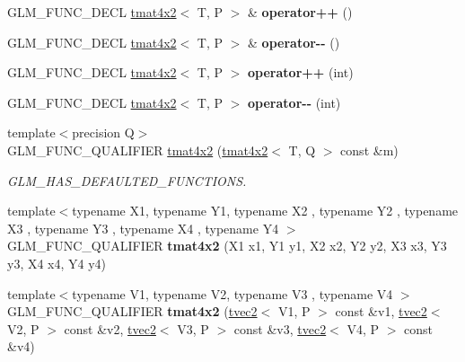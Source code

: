 \begin{DoxyCompactItemize}
G\+L\+M\+\_\+\+F\+U\+N\+C\+\_\+\+D\+E\+CL \hyperlink{structglm_1_1tmat4x2}{tmat4x2}$<$ T, P $>$ \& {\bfseries operator++} ()
\item 
\mbox{\label{structglm_1_1tmat4x2_acb22e08a3abe9442d718346508b76681}} 
G\+L\+M\+\_\+\+F\+U\+N\+C\+\_\+\+D\+E\+CL \hyperlink{structglm_1_1tmat4x2}{tmat4x2}$<$ T, P $>$ \& {\bfseries operator-\/-\/} ()
\item 
\mbox{\label{structglm_1_1tmat4x2_af0211253087f7df4afb95aeba8daef24}} 
G\+L\+M\+\_\+\+F\+U\+N\+C\+\_\+\+D\+E\+CL \hyperlink{structglm_1_1tmat4x2}{tmat4x2}$<$ T, P $>$ {\bfseries operator++} (int)
\item 
\mbox{\label{structglm_1_1tmat4x2_a6e82215ef61cf4f3b4a1cf3bfe21d6fc}} 
G\+L\+M\+\_\+\+F\+U\+N\+C\+\_\+\+D\+E\+CL \hyperlink{structglm_1_1tmat4x2}{tmat4x2}$<$ T, P $>$ {\bfseries operator-\/-\/} (int)
\item 
\mbox{\label{structglm_1_1tmat4x2_aabba725bdf197091f8eab5a583201fca}} 
{\footnotesize template$<$precision Q$>$ }\\G\+L\+M\+\_\+\+F\+U\+N\+C\+\_\+\+Q\+U\+A\+L\+I\+F\+I\+ER \hyperlink{structglm_1_1tmat4x2_aabba725bdf197091f8eab5a583201fca}{tmat4x2} (\hyperlink{structglm_1_1tmat4x2}{tmat4x2}$<$ T, Q $>$ const \&m)
\begin{DoxyCompactList}\small\item\em G\+L\+M\+\_\+\+H\+A\+S\+\_\+\+D\+E\+F\+A\+U\+L\+T\+E\+D\+\_\+\+F\+U\+N\+C\+T\+I\+O\+NS. \end{DoxyCompactList}\item 
\mbox{\label{structglm_1_1tmat4x2_af1595b0913a2bc31ff60ab847a351d4e}} 
{\footnotesize template$<$typename X1, typename Y1, typename X2 , typename Y2 , typename X3 , typename Y3 , typename X4 , typename Y4 $>$ }\\G\+L\+M\+\_\+\+F\+U\+N\+C\+\_\+\+Q\+U\+A\+L\+I\+F\+I\+ER {\bfseries tmat4x2} (X1 x1, Y1 y1, X2 x2, Y2 y2, X3 x3, Y3 y3, X4 x4, Y4 y4)
\item 
\mbox{\label{structglm_1_1tmat4x2_a3d41b266dfeb276e13db820296663cea}} 
{\footnotesize template$<$typename V1, typename V2, typename V3 , typename V4 $>$ }\\G\+L\+M\+\_\+\+F\+U\+N\+C\+\_\+\+Q\+U\+A\+L\+I\+F\+I\+ER {\bfseries tmat4x2} (\hyperlink{structglm_1_1tvec2}{tvec2}$<$ V1, P $>$ const \&v1, \hyperlink{structglm_1_1tvec2}{tvec2}$<$ V2, P $>$ const \&v2, \hyperlink{structglm_1_1tvec2}{tvec2}$<$ V3, P $>$ const \&v3, \hyperlink{structglm_1_1tvec2}{tvec2}$<$ V4, P $>$ const \&v4)

\end{DoxyCompactItemize}
